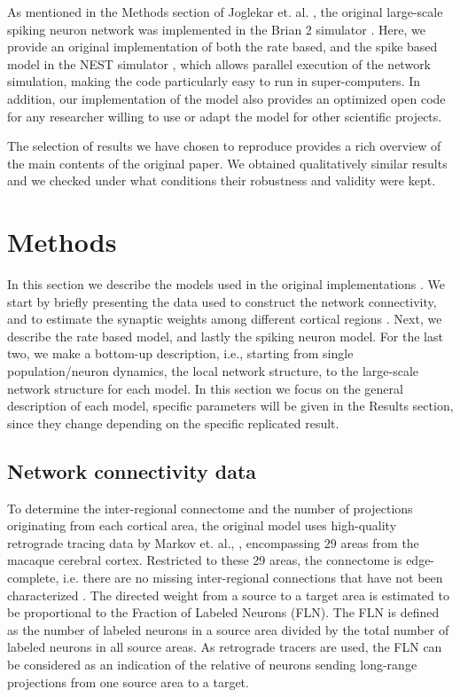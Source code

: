 \indent As mentioned in the Methods section of Joglekar et. al. \cite{joglekar2018inter}, the original large-scale spiking neuron network was implemented in the Brian 2 simulator \cite{stimberg2019brian}. Here, we provide an original implementation of both the rate based, and the spike based model in the NEST simulator \cite{gewaltig2007nest, jordan2019nest}, which allows parallel execution of the network simulation, making the code particularly easy to run in super-computers. 
In addition, our implementation of the model also provides an optimized open code for any researcher willing to use or adapt the model for other scientific projects.

The selection of results we have chosen to reproduce provides a rich overview of the main contents of the original paper. We obtained qualitatively similar results and we checked under what conditions their robustness and validity were kept.  

\section{Methods}\label{methods}

In this section we describe the models used in the original implementations \cite{joglekar2018inter}. We start by briefly presenting the data used to construct the network connectivity, and to estimate the synaptic weights among different cortical regions \cite{markov2014b}. Next, we describe the rate based model, and lastly the spiking neuron model. For the last two, we make a bottom-up description, i.e., starting from single population/neuron dynamics, the local network structure, to the large-scale network structure for each model. In this section we focus on the general description of each model, specific parameters will be given in the Results section, since they change depending on the specific replicated result.

\subsection{Network connectivity data}\label{netowork}

To determine the inter-regional connectome and the number of projections originating from each cortical area, the original model uses high-quality retrograde tracing data by Markov et. al., \cite{markov2014b}, encompassing $29$ areas from the macaque cerebral cortex. Restricted to these 29 areas, the connectome is edge-complete, i.e. there are no missing inter-regional connections that have not been characterized \cite{Markov2013}. The directed weight from a source to a target area is estimated to be proportional to the Fraction of Labeled Neurons (FLN). The FLN is defined as the number of labeled neurons in a source area divided by the total number of labeled neurons in all source areas. As retrograde tracers are used, the FLN can be considered as an indication of the relative of neurons sending long-range projections from one source area to a target.

